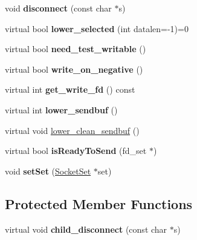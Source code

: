 \begin{DoxyCompactItemize}
\item 
void {\bfseries disconnect} (const char $\ast$s)\hypertarget{classVsnetSocketBase_a7f64ea321fe9e39af21648b5169d2241}{}\label{classVsnetSocketBase_a7f64ea321fe9e39af21648b5169d2241}

\item 
virtual bool {\bfseries lower\+\_\+selected} (int datalen=-\/1)=0\hypertarget{classVsnetSocketBase_a54fe726485cdcc7e2fd9dcb5d736e8fd}{}\label{classVsnetSocketBase_a54fe726485cdcc7e2fd9dcb5d736e8fd}

\item 
virtual bool {\bfseries need\+\_\+test\+\_\+writable} ()\hypertarget{classVsnetSocketBase_a3a444b80c83b5212f8c77665332fbb82}{}\label{classVsnetSocketBase_a3a444b80c83b5212f8c77665332fbb82}

\item 
virtual bool {\bfseries write\+\_\+on\+\_\+negative} ()\hypertarget{classVsnetSocketBase_a9805a3950951b10b14c7bda6f6bd260e}{}\label{classVsnetSocketBase_a9805a3950951b10b14c7bda6f6bd260e}

\item 
virtual int {\bfseries get\+\_\+write\+\_\+fd} () const \hypertarget{classVsnetSocketBase_aa9132a48faae9d343ff9e10c9dab6a04}{}\label{classVsnetSocketBase_aa9132a48faae9d343ff9e10c9dab6a04}

\item 
virtual int {\bfseries lower\+\_\+sendbuf} ()\hypertarget{classVsnetSocketBase_a0e9813917184651a305cea5bb415354f}{}\label{classVsnetSocketBase_a0e9813917184651a305cea5bb415354f}

\item 
virtual void \hyperlink{classVsnetSocketBase_a0f72c451d0fb66744af779637382b0b2}{lower\+\_\+clean\+\_\+sendbuf} ()
\item 
virtual bool {\bfseries is\+Ready\+To\+Send} (fd\+\_\+set $\ast$)\hypertarget{classVsnetSocketBase_a2dae38617f2cdcd3319fc24e56f994f2}{}\label{classVsnetSocketBase_a2dae38617f2cdcd3319fc24e56f994f2}

\item 
void {\bfseries set\+Set} (\hyperlink{classSocketSet}{Socket\+Set} $\ast$set)\hypertarget{classVsnetSocketBase_a1a5a995758d1530b5163eddc8b22bbba}{}\label{classVsnetSocketBase_a1a5a995758d1530b5163eddc8b22bbba}

\end{DoxyCompactItemize}
\subsection*{Protected Member Functions}
\begin{DoxyCompactItemize}
\item 
virtual void {\bfseries child\+\_\+disconnect} (const char $\ast$s)\hypertarget{classVsnetSocketBase_a87a358d06f8df6f125e6f351d240d132}{}\label{classVsnetSocketBase_a87a358d06f8df6f125e6f351d240d132}

\end{DoxyCompactItemize}
